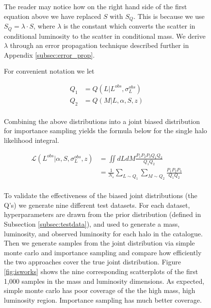 \documentclass[\docopts]{\docclass}
\begin{document}
\begin{figure}[h!]
The reader may notice how on the right hand side of the first equation above we have replaced $S$ with $S_Q$. 
This is because we use $S_Q = \lambda \cdot S$, where $\lambda$ is the constant which converts the scatter in conditional luminosity to the scatter in conditional mass.
We derive $\lambda$ through an error propagation technique described further in Appendix \ref{subsec:error_prop}.

For convenient notation we let

\begin{align*}
Q_1 &= Q(L|L^{obs}, \sigma_L^{obs})\\
Q_2 &= Q(M|L,\alpha, S, z)\\
\end{align*}

\noindent Combining the above distributions into a joint biased distribution for importance sampling yields the formula below for the single halo likelihood integral.

\begin{align*}
\mathcal{L}(L^{obs}|\alpha, S, \sigma_L^{obs}, z) &= \iint dLdM \frac{P_1P_2P_3Q_1Q_2}{Q_1Q_2}\\
&= \frac{1}{N_s}\sum_{L \sim Q_1}\sum_{M \sim Q_2} \frac{P_1P_2P_3}{Q_1Q_2}\\
\end{align*}


To validate the effectiveness of the biased joint distributions (the Q's) we generate nine different test datasets. For each dataset, hyperparameters are drawn from the prior distribution (defined in Subsection \ref{subsec:testdata}), and used to generate a mass, luminosity, and observed luminosity for each halo in the catalogue.
Then we generate samples from the joint distribution via simple monte carlo and importance sampling and compare how efficiently the two approaches cover the true joint distribution.
Figure \ref{fig:isworks} shows the nine corresponding scatterplots of the first 1,000 samples in the mass and luminosity dimensions. 
As expected, simple monte carlo has poor coverage of the the high mass, high luminosity region.
Importance sampling has much better coverage.


\end{figure}
\end{document}
